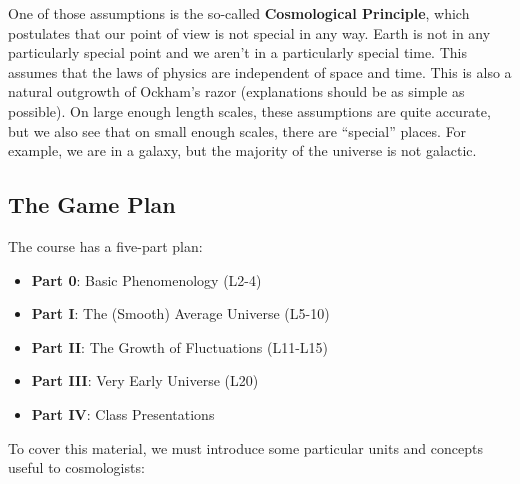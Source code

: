 \documentclass[10pt]{article}
\numberwithin{equation}{section}
\newcommand{\n}{\noindent}
\begin{document}
	\n One of those assumptions is the so-called \textbf{Cosmological Principle}, which postulates that our point of view is not special in any way. Earth is not in any particularly special point and we aren't in a particularly special time. This assumes that the laws of physics are independent of space and time. This is also a natural outgrowth of Ockham's razor (explanations should be as simple as possible). On large enough length scales, these assumptions are quite accurate, but we also see that on small enough scales, there are ``special'' places. For example, we are in a galaxy, but the majority of the universe is not galactic.
	\subsection{The Game Plan} %
	\label{sub:the_game_plan}
		The course has a five-part plan:
		\begin{itemize}
			\item \textbf{Part 0}: Basic Phenomenology (L2-4)
			\item \textbf{Part I}: The (Smooth) Average Universe (L5-10)
			\item \textbf{Part II}: The Growth of Fluctuations (L11-L15)
			\item \textbf{Part III}: Very Early Universe (L20)
			\item \textbf{Part IV}: Class Presentations
		\end{itemize}
		To cover this material, we must introduce some particular units and concepts useful to cosmologists:
\end{document}
